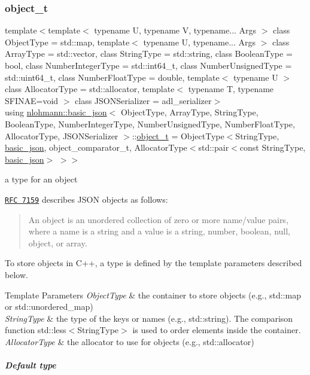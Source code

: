 \subsubsection{\texorpdfstring{object\+\_\+t}{object\_t}}
{\footnotesize\ttfamily template$<$template$<$ typename U, typename V, typename... Args $>$ class Object\+Type = std\+::map, template$<$ typename U, typename... Args $>$ class Array\+Type = std\+::vector, class String\+Type  = std\+::string, class Boolean\+Type  = bool, class Number\+Integer\+Type  = std\+::int64\+\_\+t, class Number\+Unsigned\+Type  = std\+::uint64\+\_\+t, class Number\+Float\+Type  = double, template$<$ typename U $>$ class Allocator\+Type = std\+::allocator, template$<$ typename T, typename S\+F\+I\+N\+A\+E=void $>$ class J\+S\+O\+N\+Serializer = adl\+\_\+serializer$>$ \\
using \mbox{\hyperlink{classnlohmann_1_1basic__json}{nlohmann\+::basic\+\_\+json}}$<$ Object\+Type, Array\+Type, String\+Type, Boolean\+Type, Number\+Integer\+Type, Number\+Unsigned\+Type, Number\+Float\+Type, Allocator\+Type, J\+S\+O\+N\+Serializer $>$\+::\mbox{\hyperlink{classnlohmann_1_1basic__json_a5e48a7893520e1314bf0c9723e26ea2a}{object\+\_\+t}} =  Object\+Type$<$String\+Type, \mbox{\hyperlink{classnlohmann_1_1basic__json}{basic\+\_\+json}}, object\+\_\+comparator\+\_\+t, Allocator\+Type$<$std\+::pair$<$const String\+Type, \mbox{\hyperlink{classnlohmann_1_1basic__json}{basic\+\_\+json}}$>$ $>$$>$}



a type for an object 

\href{http://rfc7159.net/rfc7159}{\tt R\+FC 7159} describes J\+S\+ON objects as follows\+: \begin{quote}
An object is an unordered collection of zero or more name/value pairs, where a name is a string and a value is a string, number, boolean, null, object, or array. \end{quote}


To store objects in C++, a type is defined by the template parameters described below.


\begin{DoxyTemplParams}{Template Parameters}
{\em Object\+Type} & the container to store objects (e.\+g., {\ttfamily std\+::map} or {\ttfamily std\+::unordered\+\_\+map}) \\
\hline
{\em String\+Type} & the type of the keys or names (e.\+g., {\ttfamily std\+::string}). The comparison function {\ttfamily std\+::less$<$String\+Type$>$} is used to order elements inside the container. \\
\hline
{\em Allocator\+Type} & the allocator to use for objects (e.\+g., {\ttfamily std\+::allocator})\\
\hline
\end{DoxyTemplParams}
\subparagraph*{Default type}

